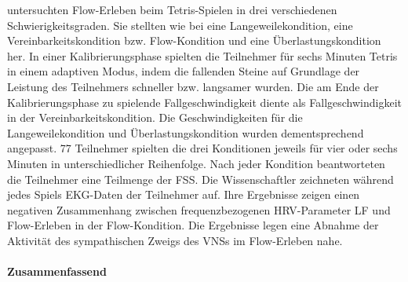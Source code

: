 untersuchten Flow-Erleben beim Tetris-Spielen in drei verschiedenen Schwierigkeitsgraden. Sie stellten wie bei \citet{Keller2011, Tozman2015} eine Langeweilekondition, eine Vereinbarkeitskondition bzw. Flow-Kondition und eine Überlastungskondition her. In einer Kalibrierungsphase spielten die Teilnehmer für sechs Minuten Tetris in einem adaptiven Modus, indem die fallenden Steine auf Grundlage der Leistung des Teilnehmers schneller bzw. langsamer wurden. Die am Ende der Kalibrierungsphase zu spielende Fallgeschwindigkeit diente als Fallgeschwindigkeit in der Vereinbarkeitskondition. Die Geschwindigkeiten für die Langeweilekondition und Überlastungskondition wurden dementsprechend angepasst. 77 Teilnehmer spielten die drei Konditionen jeweils für vier oder sechs Minuten in unterschiedlicher Reihenfolge. Nach jeder Kondition beantworteten die Teilnehmer eine Teilmenge der \ac{FSS}. Die Wissenschaftler zeichneten während jedes Spiels \ac{EKG}-Daten der Teilnehmer auf. Ihre Ergebnisse zeigen einen negativen Zusammenhang zwischen frequenzbezogenen \ac{HRV}-Parameter \acs{LF} und Flow-Erleben in der Flow-Kondition. Die Ergebnisse legen eine Abnahme der Aktivität des sympathischen Zweigs des \ac{VNS}s im Flow-Erleben nahe.

\paragraph{Zusammenfassend} 

